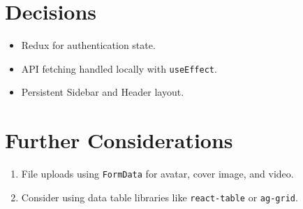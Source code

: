 \documentclass[a4paper,12pt]{article}
\begin{document}
\section*{Decisions}
\begin{itemize}
\item Redux for authentication state.
\item API fetching handled locally with \texttt{useEffect}.
\item Persistent Sidebar and Header layout.
\end{itemize}

\section*{Further Considerations}
\begin{enumerate}
\item File uploads using \texttt{FormData} for avatar, cover image, and video.
\item Consider using data table libraries like \texttt{react-table} or \texttt{ag-grid}.
\end{enumerate}
\end{document}
